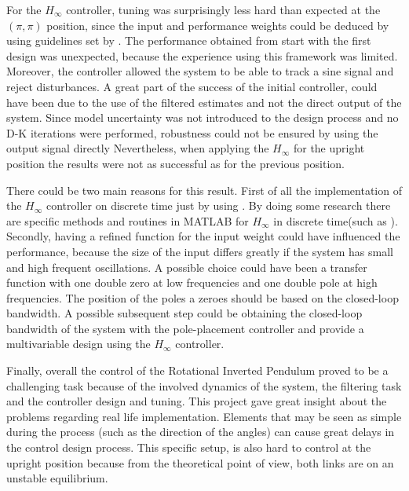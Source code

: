 \documentclass[main.tex]{subfiles}
\begin{document}
For the $H_{\infty}$ controller, tuning was surprisingly less hard than expected at the $(\pi,\pi)$ position, since the input and performance weights could be deduced by using guidelines set by \cite{Skogestad}. The performance obtained from start with the first design was unexpected, because the experience using this framework was limited. Moreover, the controller allowed the system to be able to track a sine signal and reject disturbances. 
A great part of the success of the initial controller, could have been due to the use of the filtered estimates and not the direct output of the system. Since model uncertainty was not introduced to the design process and no D-K iterations were performed, robustness could not be ensured by using the output signal directly Nevertheless, when applying the $H_\infty$ for the upright position the results were not as successful as for the previous position. 

There could be two main reasons for this result. First of all the implementation of the $H_\infty$ controller on discrete time just by using . By doing some research there are specific methods and routines in MATLAB\textsuperscript{\textregistered} for $H_\infty$ in discrete time(such as ). Secondly, having a refined function for the input weight could have influenced the performance, because the size of the input differs greatly if the system has small and high frequent oscillations. A possible choice could have been a transfer function with one double zero at low frequencies and  one double pole at high frequencies. The position of the poles a zeroes should be based on the closed-loop bandwidth. A possible subsequent step could be obtaining the closed-loop bandwidth of the system with the pole-placement controller and provide a multivariable design using the $H_\infty$ controller.

Finally, overall the control of the Rotational Inverted Pendulum proved to be a challenging task because of the involved dynamics of the system, the filtering task and the controller design and tuning. This project gave great insight about the problems regarding real life implementation. Elements that may be seen as simple during the process (such as the direction of the angles) can cause great delays in the control design process. This specific setup, is also hard to control at the upright position because from the theoretical point of view, both links are on an unstable equilibrium.
\end{document}
